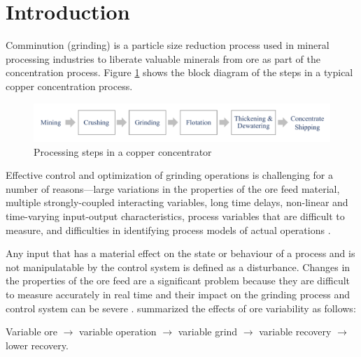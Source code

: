 \chapter*{Introduction}         %
\label{chap-introduction}       %


Comminution (grinding) is a particle size reduction process used in mineral processing industries to liberate valuable minerals from ore as part of the concentration process. Figure \ref{fig:process-block-diagram} shows the block diagram of the steps in a typical copper concentration process.

\begin{figure}[htp]
	\centering
	\includegraphics[width=15cm]{images/process_block_diagram.pdf}
	\caption{Processing steps in a copper concentrator} \label{fig:process-block-diagram}
\end{figure}

Effective control and optimization of grinding operations is challenging for a number of reasons---large variations in the properties of the ore feed material, multiple strongly-coupled interacting variables, long time delays, non-linear and time-varying input-output characteristics, process variables that are difficult to measure, and difficulties in identifying process models of actual operations \citep{olivier_dual_2012, gough_sag_2015, le_roux_throughput_2016, aguila-camacho_control_2017}. 

Any input that has a material effect on the state or behaviour of a process and is not manipulatable by the control system is defined as a disturbance. Changes in the properties of the ore feed are a significant problem because they are difficult to measure accurately in real time and their impact on the grinding process and control system can be severe \citep{herbst_optimal_1988, cesar_multivariable_2009, remes_grinding_2010, liu_development_2018}. \cite{powell_applying_2009} summarized the effects of ore variability as follows:

Variable ore $\to$ variable operation $\to$ variable grind $\to$ variable recovery $\to$ lower recovery. 

